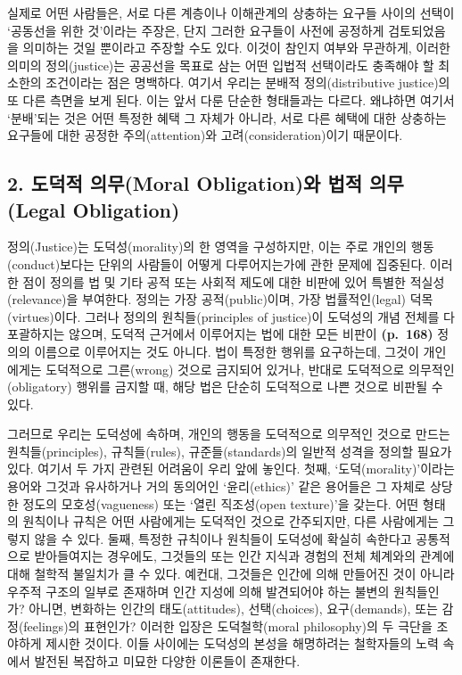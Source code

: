 실제로 어떤 사람들은, 서로 다른 계층이나 이해관계의 상충하는 요구들
사이의 선택이 `공동선을 위한 것'이라는 주장은, 단지 그러한 요구들이
사전에 공정하게 검토되었음을 의미하는 것일 뿐이라고 주장할 수도 있다.
이것이 참인지 여부와 무관하게, 이러한 의미의 정의(justice)는 공공선을
목표로 삼는 어떤 입법적 선택이라도 충족해야 할 최소한의 조건이라는 점은
명백하다. 여기서 우리는 분배적 정의(distributive justice)의 또 다른
측면을 보게 된다. 이는 앞서 다룬 단순한 형태들과는 다르다. 왜냐하면
여기서 `분배'되는 것은 어떤 특정한 혜택 그 자체가 아니라, 서로 다른
혜택에 대한 상충하는 요구들에 대한 공정한 주의(attention)와
고려(consideration)이기 때문이다.

\subsection{2. 도덕적 의무(Moral Obligation)와 법적 의무(Legal
Obligation)}\label{uxb3c4uxb355uxc801-uxc758uxbb34moral-obligationuxc640-uxbc95uxc801-uxc758uxbb34legal-obligation}

정의(Justice)는 도덕성(morality)의 한 영역을 구성하지만, 이는 주로
개인의 행동(conduct)보다는  단위의 사람들이 어떻게
다루어지는가에 관한 문제에 집중된다. 이러한 점이 정의를 법 및 기타 공적
또는 사회적 제도에 대한 비판에 있어 특별한 적실성(relevance)을 부여한다.
정의는 가장 공적(public)이며, 가장 법률적인(legal) 덕목(virtues)이다.
그러나 정의의 원칙들(principles of justice)이 도덕성의 개념 전체를 다
포괄하지는 않으며, 도덕적 근거에서 이루어지는 법에 대한 모든 비판이
\textbf{(p.~168)} 정의의 이름으로 이루어지는 것도 아니다. 법이 특정한
행위를 요구하는데, 그것이 개인에게는 도덕적으로 그른(wrong) 것으로
금지되어 있거나, 반대로 도덕적으로 의무적인(obligatory) 행위를 금지할
때, 해당 법은 단순히 도덕적으로 나쁜 것으로 비판될 수 있다.

그러므로 우리는 도덕성에 속하며, 개인의 행동을 도덕적으로 의무적인
것으로 만드는 원칙들(principles), 규칙들(rules), 규준들(standards)의
일반적 성격을 정의할 필요가 있다. 여기서 두 가지 관련된 어려움이 우리
앞에 놓인다. 첫째, `도덕(morality)'이라는 용어와 그것과 유사하거나 거의
동의어인 `윤리(ethics)' 같은 용어들은 그 자체로 상당한 정도의
모호성(vagueness) 또는 `열린 직조성(open texture)'을 갖는다. 어떤 형태의
원칙이나 규칙은 어떤 사람에게는 도덕적인 것으로 간주되지만, 다른
사람에게는 그렇지 않을 수 있다. 둘째, 특정한 규칙이나 원칙들이 도덕성에
확실히 속한다고 공통적으로 받아들여지는 경우에도, 그것들의
 또는 인간 지식과 경험의 전체 체계와의 관계에 대해
철학적 불일치가 클 수 있다. 예컨대, 그것들은 인간에 의해 만들어진 것이
아니라 우주적 구조의 일부로 존재하며 인간 지성에 의해 발견되어야 하는
불변의 원칙들인가? 아니면, 변화하는 인간의 태도(attitudes),
선택(choices), 요구(demands), 또는 감정(feelings)의 표현인가? 이러한
입장은 도덕철학(moral philosophy)의 두 극단을 조야하게 제시한 것이다.
이들 사이에는 도덕성의 본성을 해명하려는 철학자들의 노력 속에서 발전된
복잡하고 미묘한 다양한 이론들이 존재한다.

